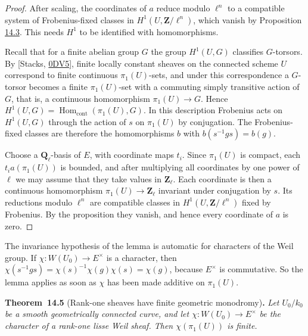\documentclass[11pt]{article}
\newenvironment{bpstatement}[2]{\par\addvspace{0.6\baselineskip}\noindent\textbf{#1}#2\textbf{.}\enspace\ignorespaces}
  {\par\addvspace{0.4\baselineskip}}
\newenvironment{bpstatementit}[2]{\begin{bpstatement}{#1}{#2}\itshape\ignorespaces}{\end{bpstatement}}
\providecommand{\Hom}{}\renewcommand{\Hom}{\operatorname{Hom}}
\begin{document}
\begin{proof}[{Proof}]\label{bp56}%
After scaling, the coordinates of \(a\) reduce modulo \(\ell^n\) to a compatible system of Frobenius-fixed classes in \(H^1(U,\mathbf Z/\ell^n)\), which vanish by Proposition \hyperref[bp51]{14.3}. This needs \(H^1\) to be identified with homomorphisms.

Recall that for a finite abelian group \(G\) the group \(H^1(U,G)\) classifies \(G\)-torsors. By [Stacks, \href{https://stacks.math.columbia.edu/tag/0DV5}{0DV5}], finite locally constant sheaves on the connected scheme \(U\) correspond to finite continuous \(\pi_1(U)\)-sets, and under this correspondence a \(G\)-torsor becomes a finite \(\pi_1(U)\)-set with a commuting simply transitive action of \(G\), that is, a continuous homomorphism \(\pi_1(U)\to G\). Hence \(H^1(U,G)=\Hom_{\mathrm{cont}}(\pi_1(U),G)\). In this description Frobenius acts on \(H^1(U,G)\) through the action of \(s\) on \(\pi_1(U)\) by conjugation. The Frobenius-fixed classes are therefore the homomorphisms \(b\) with \(b(s^{-1}gs)=b(g)\).

Choose a \(\mathbf Q_\ell\)-basis of \(E\), with coordinate maps \(t_i\).  Since \(\pi_1(U)\) is compact, each \(t_i a(\pi_1(U))\) is bounded, and after multiplying all coordinates by one power of \(\ell\) we may assume that they take values in \(\mathbf Z_\ell\).  Each coordinate is then a continuous homomorphism \(\pi_1(U)\to\mathbf Z_\ell\) invariant under conjugation by \(s\). Its reductions modulo \(\ell^n\) are compatible classes in \(H^1(U,\mathbf Z/\ell^n)\) fixed by Frobenius. By the proposition they vanish, and hence every coordinate of \(a\) is zero.
\end{proof}

\label{bp57}%
The invariance hypothesis of the lemma is automatic for characters of the Weil group. If \(\chi:W(U_0)\to E^\times\) is a character, then \(\chi(s^{-1}gs)=\chi(s)^{-1}\chi(g)\chi(s)=\chi(g)\), because \(E^\times\) is commutative. So the lemma applies as soon as \(\chi\) has been made additive on \(\pi_1(U)\).

\label{bp58}%
\begin{bpstatementit}{Theorem~14.5}{ (Rank-one sheaves have finite geometric monodromy)}
Let \(U_0/k_0\) be a smooth geometrically connected curve, and let \(\chi:W(U_0)\to E^\times\) be the character of a rank-one lisse Weil sheaf.  Then \(\chi(\pi_1(U))\) is finite.
\end{bpstatementit}
\end{document}
